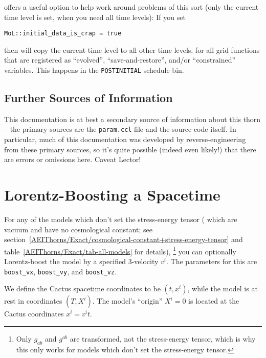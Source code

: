  offers a useful option to help work around problems
of this sort (only the current time level is set, when you need
all time levels):  If you set
\begin{verbatim}
MoL::initial_data_is_crap = true
\end{verbatim}
then  will copy the current time level to all other time
levels, for all grid functions that are registered as ``evolved'',
``save-and-restore'', and/or ``constrained'' variables.  This happens
in the \verb|POSTINITIAL| schedule bin.


\subsection{Further Sources of Information}

This documentation is at best a secondary source of information about
this thorn -- the primary sources are the \verb|param.ccl| file and
the source code itself.  In particular, much of this documentation
was developed by reverse-engineering from these primary sources, so
it's quite possible (indeed even likely!) that there are errors or
omissions here.  Caveat Lector!


\section{Lorentz-Boosting a Spacetime}
\label{AEIThorns/Exact/sect-Lorentz-boosting-a-spacetime}

For any of the models which don't set the stress-energy tensor
(\ie{} which are vacuum and have no cosmological constant;
see section~\ref{AEIThorns/Exact/cosmological-constant+stress-energy-tensor}
and table~\ref{AEIThorns/Exact/tab-all-models} for details),%
\footnote{%
	 Only $g_{ab}$ and $g^{ab}$ are transformed, not the
	 stress-energy tensor, which is why this only works
	 for models which don't set the stress-energy tensor.
	 }%
{} you can optionally Lorentz-boost the model by a specified 3-velocity
$v^i$.  The parameters for this are \verb|boost_vx|, \verb|boost_vy|,
and \verb|boost_vz|.

We define the Cactus spacetime coordinates to be $(t,x^i)$,
while the model is at rest in coordinates $(T,X^i)$.  The model's
``origin'' $X^i = 0$ is located at the Cactus coordinates $x^i = v^i t$.  

